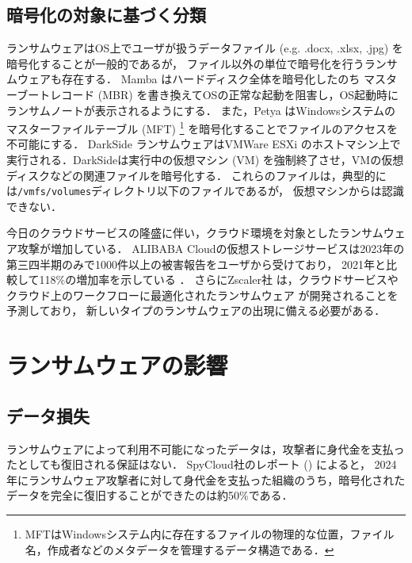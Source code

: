 \subsection{暗号化の対象に基づく分類}
ランサムウェアはOS上でユーザが扱うデータファイル (e.g. .docx, .xlsx, .jpg) を暗号化することが一般的であるが，
ファイル以外の単位で暗号化を行うランサムウェアも存在する．
Mamba \cite{mamba-petya} はハードディスク全体を暗号化したのち
マスターブートレコード (MBR) を書き換えてOSの正常な起動を阻害し，OS起動時にランサムノートが表示されるようにする．
また，Petya \cite{mamba-petya} はWindowsシステムのマスターファイルテーブル (MFT)
\footnote{MFTはWindowsシステム内に存在するファイルの物理的な位置，ファイル名，作成者などのメタデータを管理するデータ構造である．}
を暗号化することでファイルのアクセスを不可能にする．
DarkSide \cite{DarkSide42:online} ランサムウェアはVMWare ESXi \cite{VMwarevS52:online}
のホストマシン上で実行される．DarkSideは実行中の仮想マシン (VM) を強制終了させ，VMの仮想ディスクなどの関連ファイルを暗号化する．
これらのファイルは，典型的には\texttt{/vmfs/volumes}ディレクトリ以下のファイルであるが，
仮想マシンからは認識できない．

今日のクラウドサービスの隆盛に伴い，クラウド環境を対象としたランサムウェア攻撃が増加している．
ALIBABA Cloudの仮想ストレージサービスは2023年の第三四半期のみで1000件以上の被害報告をユーザから受けており，
2021年と比較して118\%の増加率を示している \cite{wang2024ransom}．
さらにZscaler社  は，クラウドサービスやクラウド上のワークフローに最適化されたランサムウェア
が開発されることを予測\cite{zscaler-ransomware}しており，
新しいタイプのランサムウェアの出現に備える必要がある．

\section{ランサムウェアの影響}
\subsection{データ損失}
ランサムウェアによって利用不可能になったデータは，攻撃者に身代金を支払ったとしても復旧される保証はない．
SpyCloud社のレポート \cite{spycloud-ransomware} () によると，
2024年にランサムウェア攻撃者に対して身代金を支払った組織のうち，暗号化されたデータを完全に復旧することができたのは約50\%である．

